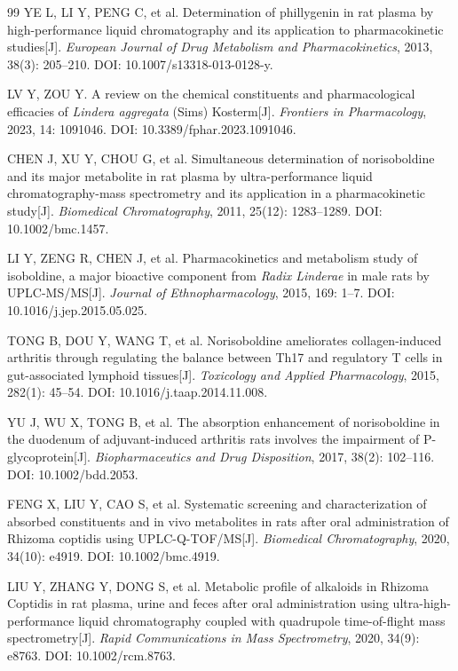 \documentclass[12pt,a4paper,UTF8,scheme=chinese]{ctexart}
\begin{document}
\begin{thebibliography}{99}
YE L, LI Y, PENG C, et al. Determination of phillygenin in rat plasma by high-performance liquid chromatography and its application to pharmacokinetic studies[J]. \textit{European Journal of Drug Metabolism and Pharmacokinetics}, 2013, 38(3): 205--210. DOI: 10.1007/s13318-013-0128-y.

LV Y, ZOU Y. A review on the chemical constituents and pharmacological efficacies of \textit{Lindera aggregata} (Sims) Kosterm[J]. \textit{Frontiers in Pharmacology}, 2023, 14: 1091046. DOI: 10.3389/fphar.2023.1091046.

CHEN J, XU Y, CHOU G, et al. Simultaneous determination of norisoboldine and its major metabolite in rat plasma by ultra-performance liquid chromatography-mass spectrometry and its application in a pharmacokinetic study[J]. \textit{Biomedical Chromatography}, 2011, 25(12): 1283--1289. DOI: 10.1002/bmc.1457.

LI Y, ZENG R, CHEN J, et al. Pharmacokinetics and metabolism study of isoboldine, a major bioactive component from \textit{Radix Linderae} in male rats by UPLC-MS/MS[J]. \textit{Journal of Ethnopharmacology}, 2015, 169: 1--7. DOI: 10.1016/j.jep.2015.05.025.

TONG B, DOU Y, WANG T, et al. Norisoboldine ameliorates collagen-induced arthritis through regulating the balance between Th17 and regulatory T cells in gut-associated lymphoid tissues[J]. \textit{Toxicology and Applied Pharmacology}, 2015, 282(1): 45--54. DOI: 10.1016/j.taap.2014.11.008.

YU J, WU X, TONG B, et al. The absorption enhancement of norisoboldine in the duodenum of adjuvant-induced arthritis rats involves the impairment of P-glycoprotein[J]. \textit{Biopharmaceutics and Drug Disposition}, 2017, 38(2): 102--116. DOI: 10.1002/bdd.2053.

FENG X, LIU Y, CAO S, et al. Systematic screening and characterization of absorbed constituents and in vivo metabolites in rats after oral administration of Rhizoma coptidis using UPLC-Q-TOF/MS[J]. \textit{Biomedical Chromatography}, 2020, 34(10): e4919. DOI: 10.1002/bmc.4919.

LIU Y, ZHANG Y, DONG S, et al. Metabolic profile of alkaloids in Rhizoma Coptidis in rat plasma, urine and feces after oral administration using ultra-high-performance liquid chromatography coupled with quadrupole time-of-flight mass spectrometry[J]. \textit{Rapid Communications in Mass Spectrometry}, 2020, 34(9): e8763. DOI: 10.1002/rcm.8763.


\end{thebibliography}
\end{document}
